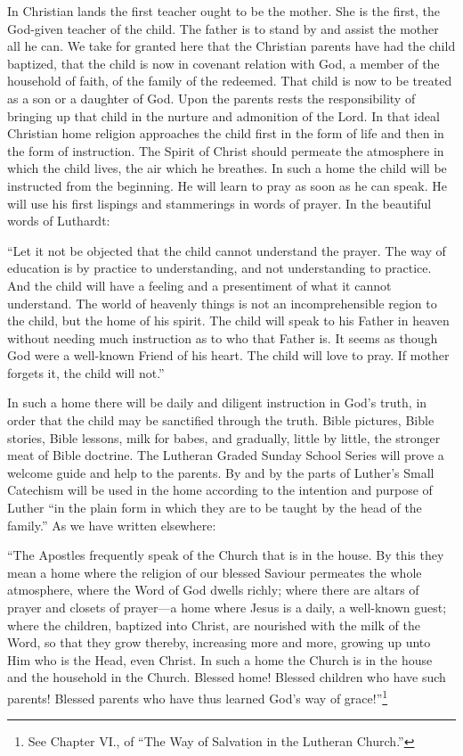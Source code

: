  In Christian lands the first teacher ought to be the mother. She is the first, the God-given teacher of the child. The father is to stand by and assist the mother all he can. We take for granted here that the Christian parents have had the child baptized, that the child is now in covenant relation with God, a member of the household of faith, of the family of the redeemed. That child is now to be treated as a son or a daughter of God. Upon the parents rests the responsibility of bringing up that
child in the nurture and admonition of the Lord. In that ideal Christian home religion approaches the child first in the form of life and then in the form of instruction. The Spirit of Christ should permeate the atmosphere in which the child lives, the air which he breathes. In such a home the child will be instructed from the beginning. He will learn to pray as soon as he can speak. He will use his first lispings and stammerings in words of prayer. In the beautiful words of Luthardt:

“Let it not be objected that the child cannot understand the prayer. The way of education is by practice to understanding, and not understanding to practice. And the child will have a feeling and a presentiment of what it cannot understand. The world of heavenly things is not an incomprehensible region to the child, but the home of his spirit. The child will speak to his Father in heaven without needing much instruction as to who that Father is. It seems as though God were a well-known Friend of his heart. The child will love to pray. If mother forgets it, the child will not.”

In such a home there will be daily and diligent instruction in God’s truth, in order that the child may be sanctified through the truth. Bible pictures, Bible stories, Bible lessons, milk for babes, and gradually, little by little, the stronger meat of Bible doctrine. The Lutheran Graded Sunday School
Series will prove a welcome guide and help to the parents. By and by the parts of Luther’s Small Catechism will be used in the home according to the intention and purpose of Luther “in the plain form in which they are to be taught by the head of the family.” As we have written elsewhere:

“The Apostles frequently speak of the Church that is in the house. By this they mean a home where the religion of our blessed Saviour permeates the whole atmosphere, where the Word of God dwells richly; where there are altars of prayer and closets of prayer—a home where Jesus is a daily, a well-known guest; where the children, baptized into Christ, are nourished with the milk of the Word, so that they grow thereby, increasing more and more, growing up unto Him who is the Head, even Christ. In such a home the Church is in the house and the household in the Church. Blessed home! Blessed children who have such parents! Blessed parents who have thus learned God’s way of grace!”\footnote{See Chapter VI., of “The Way of Salvation in the Lutheran Church.”}

